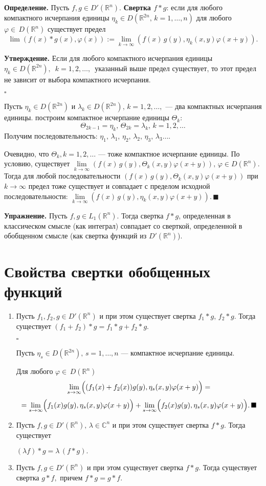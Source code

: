 \documentclass[unicode,12pt,draft]{article}
\begin{document}
\textbf{Определение.} Пусть $f,g\in D'(\mathbb R^n).$
\textbf{Свертка $f*g$}: если для любого компактного исчерпания
единицы $\eta_k\in D(\mathbb R^{2n},\,k=1,\ldots,n)$ для любого
$\varphi\in\,D(\mathbb R^n)$ существует предел
$$\lim (f(x)*g(x),\varphi(x)):=\lim\limits_{k
\to\infty}(f(x)\,g(y),\eta_k(x,y)\varphi(x+y)).$$

\textbf{Утверждение.} Если для любого компактного исчерпания
единицы $\eta_k\in D(\mathbb R^{2n}),\,\,\,k=1,2,\ldots,\,$
указанный выше предел существует, то этот предел не зависит от
выбора компактного исчерпания.

$\square$

Пусть $\eta_k\in D(\mathbb R^{2n})$ и $\lambda_k\in D(\mathbb
R^{2n}),\,k=1,2,\ldots,$ --- два компактных исчерпания единицы.
построим компактное исчерпание единицы $\Theta_k$:
$$\Theta_{2k-1}=\eta_k,\,\Theta_{2k}=\lambda_k,\,k=1,2,\ldots$$
Получим последовательность:
$\eta_1,\,\lambda_1,\,\eta_2,\,\lambda_2,\,\eta_3,\,\lambda_3\ldots.$

Очевидно, что $\Theta_k, k=1,2,\ldots$ --- тоже компактное
исчерпание единицы. По условию, существует $\lim\limits_{k
\to\infty}(f(x)\,g(y),\Theta_k(x,y)\varphi(x+y)),\,\varphi\in
D(\mathbb R^n).$ Тогда для любой последовательности
$(f(x)\,g(y),\Theta_k(x,y)\varphi(x+y))$ при $k \to\infty$ предел
тоже существует и совпадает с пределом исходной
последовательности: $\lim\limits_{k
\to\infty}(f(x)\,g(y),\eta_k(x,y)\varphi(x+y)).\,\blacksquare$

\textbf{Упражнение.} Пусть $f,g\in L_1(\mathbb R^n).$ Тогда
свертка $f*g$, определенная в классическом смысле (как интеграл)
совпадает со сверткой, определенной в обобщенном смысле (как
свертка функций из $D'(\mathbb R^n)$).

\section{Свойства свертки обобщенных функций}

\begin{enumerate}
\item Пусть $f_1,f_2,g\in D'(\mathbb R^n)$ и при этом существует
свертка $f_1*g,\,f_2*g.$ Тогда существует
$(f_1+f_2)*g=f_1*g+f_2*g.$

$\square$

Пусть $\eta_s\in D(\mathbb R^{2n}),\,s=1,\ldots,n$ --- компактное
исчерпание единицы.

Для любого $\varphi\in\,D(\mathbb R^n)$
$$\lim\limits_{s\to\infty}\Bigl((f_1(x)+f_2(x))g(y),\eta_s(x,y)\varphi(x+y)\Bigr)=$$
$$=\lim\limits_{s\to\infty}\Bigl(f_1(x)g(y),\eta_s(x,y)\varphi(x+y)\Bigr)+
\lim\limits_{s\to\infty}\Bigl(f_2(x)g(y),\eta_s(x,y)\varphi(x+y)\Bigr).\,\blacksquare$$

\item Пусть $f,g\in D'(\mathbb R^n),\,\lambda\in\mathbb C^n$ и при этом существует
свертка $f*g.$ Тогда существует

$(\lambda f)*g=\lambda \,(f*g).$
\item Пусть $f,g\in D'(\mathbb R^n)$ и при этом существует
свертка $f*g.$ Тогда существует свертка $g*f,$ причем $f*g=g*f.$
\end{enumerate}
\end{document}
